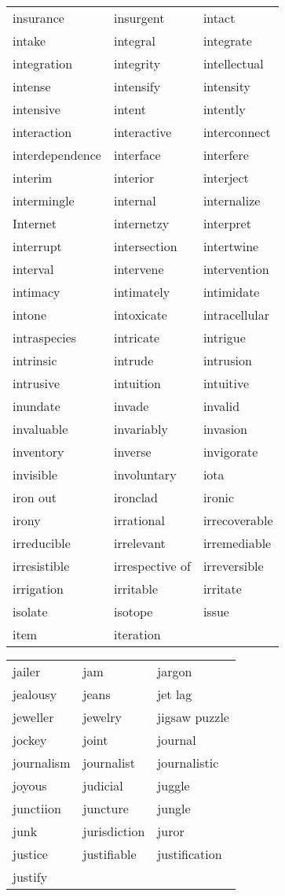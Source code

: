 \documentclass{minimal}
\begin{document}
\begin{longtable}{p{2.7cm}@{\hskip 0.2cm}p{2.7cm}@{\hskip 0.2cm}p{2.7cm}}
insurance & insurgent & intact \\
intake & integral & integrate \\
integration & integrity & intellectual \\
intense & intensify & intensity \\
intensive & intent & intently \\
interaction & interactive & interconnect \\
interdependence & interface & interfere \\
interim & interior & interject \\
intermingle & internal & internalize \\
Internet & internetzy & interpret \\
interrupt & intersection & intertwine \\
interval & intervene & intervention \\
intimacy & intimately & intimidate \\
intone & intoxicate & intracellular \\
intraspecies & intricate & intrigue \\
intrinsic & intrude & intrusion \\
intrusive & intuition & intuitive \\
inundate & invade & invalid \\
invaluable & invariably & invasion \\
inventory & inverse & invigorate \\
invisible & involuntary & iota \\
iron out & ironclad & ironic \\
irony & irrational & irrecoverable \\
irreducible & irrelevant & irremediable \\
irresistible & irrespective of & irreversible \\
irrigation & irritable & irritate \\
isolate & isotope & issue \\
item & iteration
\end{longtable}

\begin{longtable}{p{2.7cm}@{\hskip 0.2cm}p{2.7cm}@{\hskip 0.2cm}p{2.7cm}}
jailer & jam & jargon \\
jealousy & jeans & jet lag \\
jeweller & jewelry & jigsaw puzzle \\
jockey & joint & journal \\
journalism & journalist & journalistic \\
joyous & judicial & juggle \\
junctiion & juncture & jungle \\
junk & jurisdiction & juror \\
justice & justifiable & justification \\
justify
\end{longtable}
\end{document}
